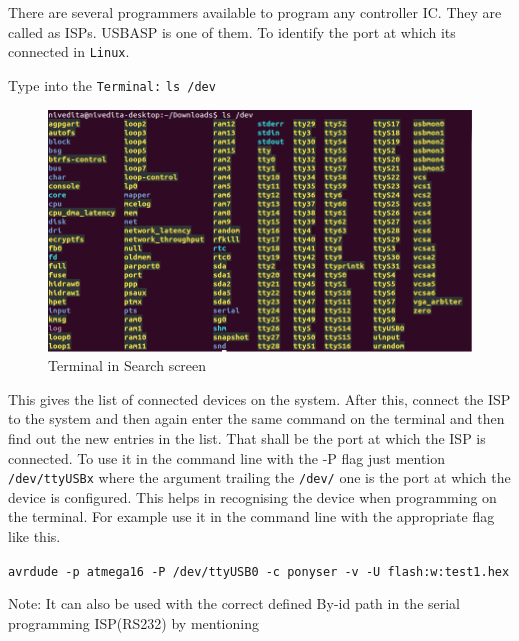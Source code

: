 \documentclass[12pt]{article}
\begin{document}
There are several programmers available to program any controller IC. They are called as ISPs. USBASP is one of them. To identify the port at which its connected in \texttt{Linux}. \vspace{12pt}

Type into the \texttt{Terminal:}
\texttt{ls /dev}\vspace{12pt}

\begin{figure}[h!]
\centering
\includegraphics[scale=0.75]{device.png}
\caption{Terminal in Search screen}
\end{figure}

This gives the list of connected devices on the system. After this, connect the ISP to the system and then again enter the same command on the terminal and then find out the new entries in the list. That shall be the port at which the ISP is connected. To use it in the command line with the -P flag just mention \texttt{/dev/ttyUSBx} where the argument trailing the \texttt{/dev/} one is the port at which the device is configured. This helps in recognising the device when programming on the terminal. For example use it in the command line with the appropriate flag like this.\vspace{12pt}

\texttt{avrdude -p atmega16 -P /dev/ttyUSB0	-c ponyser -v -U flash:w:test1.hex}\vspace{12pt}

Note: It can also be used with the correct defined By-id path in the serial programming ISP(RS232) by mentioning 
\end{document}
